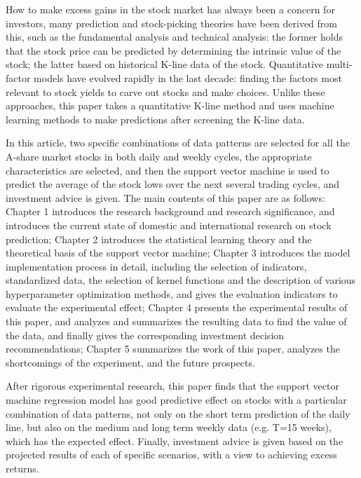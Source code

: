 \begin{enabstract}
    
    How to make excess gains in the stock market has always been a concern 
    for investors, many prediction and stock-picking theories have been 
    derived from this, such as the fundamental analysis and technical 
    analysis: the former holds that the stock price can be predicted by 
    determining the intrinsic value of the stock; the latter based on 
    historical K-line data of the stock. Quantitative multi-factor models 
    have evolved rapidly in the last decade: finding the factors most 
    relevant to stock yields to carve out stocks and make choices. Unlike 
    these approaches, this paper takes a quantitative K-line method 
    and uses machine learning methods to make predictions after screening 
    the K-line data.

    In this article, two specific combinations of data patterns are selected 
    for all the A-share market stocks in both daily and weekly cycles, the 
    appropriate characteristics are selected, and then the support vector 
    machine is used to predict the average of the stock lows over the next 
    several trading cycles, and investment advice is given. The main contents 
    of this paper are as follows: Chapter 1 introduces the research background 
    and research significance, and introduces the current state of domestic and 
    international research on stock prediction; Chapter 2 introduces the 
    statistical learning theory and the theoretical basis of the support 
    vector machine; Chapter 3 introduces the model implementation process in 
    detail, including the selection of indicators, standardized data, the 
    selection of kernel functions and the description of various hyperparameter 
    optimization methods, and gives the evaluation indicators to evaluate the 
    experimental effect; Chapter 4 presents the experimental results of this 
    paper, and analyzes and summarizes the resulting data to find the value of 
    the data, and finally gives the corresponding investment decision recommendations; 
    Chapter 5 summarizes the work of this paper, analyzes the shortcomings of 
    the experiment, and the future prospects.

    After rigorous experimental research, this paper finds that the support 
    vector machine regression model has good predictive effect on stocks 
    with a particular combination of data patterns, not only on the short 
    term prediction of the daily line, but also on the medium and long 
    term weekly data (e.g. T=15 weeks), which has the expected effect. 
    Finally, investment advice is given based on the projected results of 
    each of specific scenarios, with a view to achieving excess returns.

\end{enabstract}
